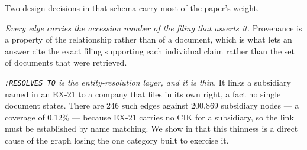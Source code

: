Two design decisions in that schema carry most of the paper's weight.

\emph{Every edge carries the accession number of the filing that asserts it.}
Provenance is a property of the relationship rather than of a document, which is
what lets an answer cite the exact filing supporting each individual claim rather
than the set of documents that were retrieved.

\emph{\texttt{:RESOLVES\_TO} is the entity-resolution layer, and it is thin.}
It links a subsidiary named in an EX-21 to a company that files in its own right,
a fact no single document states. There are 246 such edges against 200{,}869
subsidiary nodes --- a coverage of 0.12\% --- because EX-21 carries no CIK for a
subsidiary, so the link must be established by name matching. We show in
 that this thinness is a direct cause of the graph losing the
one category built to exercise it.
